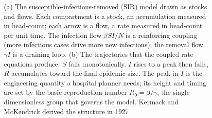 \begin{figure}[htbp]
\begin{tikzpicture}[font=\small,
  stock/.style={draw=engblack!75, fill=engblue!12, minimum width=1.2cm,
    minimum height=0.9cm, font=\small\bfseries},
  flow/.style={->, thick, draw=engblack!70}]
\end{tikzpicture}
\caption[The SIR compartment model: stocks, flows, and
trajectories]{(a) The susceptible-infectious-removed (SIR) model drawn as
stocks and flows. Each compartment is a stock, an accumulation measured
in head-count; each arrow is a flow, a rate measured in head-count per
unit time. The infection flow $\beta S I / N$ is a reinforcing coupling
(more infectious cases drive more new infections); the removal flow
$\gamma I$ is a draining loop. (b) The trajectories that the coupled rate
equations produce: $S$ falls monotonically, $I$ rises to a peak then
falls, $R$ accumulates toward the final epidemic size. The peak in $I$ is
the engineering quantity a hospital planner needs; its height and timing
are set by the basic reproduction number $R_0 = \beta/\gamma$, the single
dimensionless group that governs the model. Kermack and McKendrick
derived the structure in 1927~\cite{paper:v6c08-kermack-mckendrick-1927}.}
\label{fig:vol02:ch18:compartment-sir}
\end{figure}

